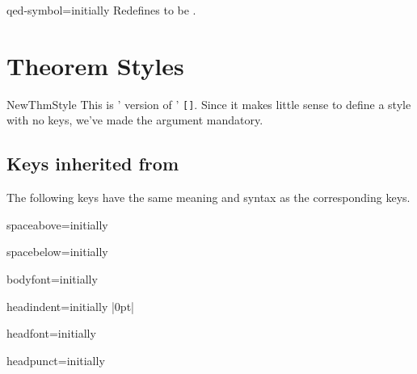 \documentclass{ltxdoc}
\newcommand{\bracks}[1]{\texttt{[#1]}}
\newcommand{\ttbraces}[1]{\braces{\texttt{#1}}}
\begin{document}
\begin{docKey}{qed-symbol}{=}{initially }
Redefines  to be .
\end{docKey}

\section{Theorem Styles}

\begin{docCommand}{NewThmStyle}{}
This is ' version of ' \bracks{}. Since it makes little sense to define a style with no keys, we've made the  argument mandatory.
\end{docCommand}

\subsection{Keys inherited from }

The following keys have the same meaning and syntax as the corresponding  keys.

\begin{docKey}{spaceabove}{=}{initially }

\end{docKey}

\begin{docKey}{spacebelow}{=}{initially }

\end{docKey}

\begin{docKey}{bodyfont}{=}{initially }

\end{docKey}

\begin{docKey}{headindent}{=}{initially |0pt|}

\end{docKey}

\begin{docKey}{headfont}{=}{initially }

\end{docKey}

\begin{docKey}{headpunct}{=}{initially \ttbraces{.}}

\end{docKey}
\end{document}
